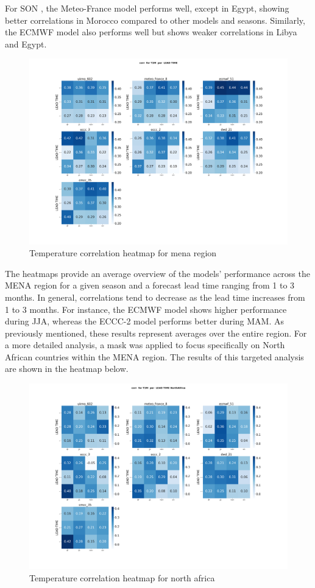 For SON , the Meteo-France model performs well, except in Egypt, showing better correlations in Morocco compared to other models and seasons. Similarly, the ECMWF model also performs well but shows weaker correlations in Libya and Egypt.
\begin{figure}[H]
    \centering
    \includegraphics[width=1\linewidth]{plots/det/corr/corr_T2M_mena.png}
    \caption{Temperature correlation heatmap for mena region}
   
\end{figure}


The heatmaps provide an average overview of the models' performance across the MENA region for a given season and a forecast lead time ranging from 1 to 3 months. In general, correlations tend to decrease as the lead time increases from 1 to 3 months. For instance, the ECMWF model shows higher performance during JJA, whereas the ECCC-2 model performs better during MAM. As previously mentioned, these results represent averages over the entire region. For a more detailed analysis, a mask was applied to focus specifically on North African countries within the MENA region. The results of this targeted analysis are shown in the heatmap below.
\begin{figure}[H]
    \centering
    \includegraphics[width=1\linewidth]{plots/det/corr/corr_T2M_NorthAfrica.png}
    \caption{Temperature correlation heatmap for north africa}
   
\end{figure}
